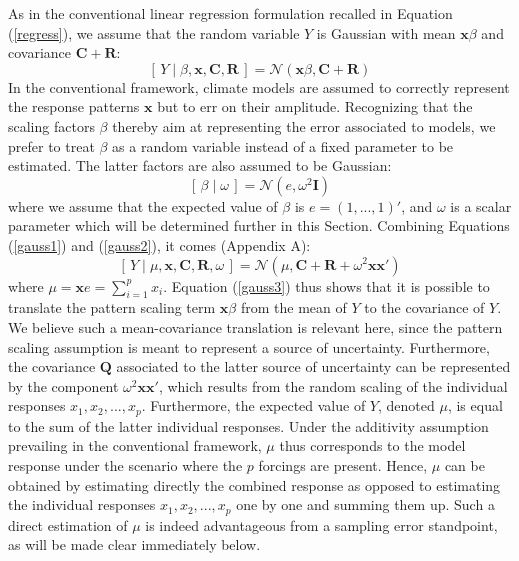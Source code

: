 \documentclass[12pt]{article}
\newcommand{\x}{\boldsymbol{x}}
\begin{document}
As in the conventional linear regression formulation recalled in Equation (\ref{regress}), %
we assume that the random variable $Y$ is Gaussian with mean $\x\beta$ and covariance $\mathbf{C}+\mathbf{R}$:%
\begin{equation} 
\label{gauss1}
\left[\,Y\mid \beta,\x,\mathbf{C}, \mathbf{R}\,\right] = \mathcal{N}(\x\beta,\mathbf{C}+\mathbf{R})
\end{equation}
In the conventional framework, climate models are assumed to correctly represent the response patterns $\x$ but to err on their amplitude. Recognizing that the scaling factors $\beta$ thereby aim at representing the error associated to models, we prefer to treat $\beta$ as a random variable instead of a fixed parameter to be estimated. The latter factors are also assumed to be Gaussian:
\begin{equation} 
\label{gauss2}
\left[\,\beta\mid\omega\,\right] =\mathcal{N}(e,\omega^2\mathbf I)
\end{equation}
where we assume that the expected value of $\beta$ is $e=(1,...,1)'$, and $\omega$ is a scalar parameter which will be determined further in this Section. Combining Equations (\ref{gauss1}) and (\ref{gauss2}), it comes (Appendix A):
\begin{equation} 
\label{gauss3}
\left[\,Y\mid\mu, \x,\mathbf{C}, \mathbf{R},\omega\,\right] =\mathcal{N}(\mu,\mathbf{C}+\mathbf{R}+\omega^2\x\x')
\end{equation}
where $\mu=\x e=\sum_{i=1}^p x_i$. Equation (\ref{gauss3}) thus shows that it is possible to translate the pattern scaling term $\x\beta$ from the mean of $Y$ to the covariance of $Y$. We believe such a mean-covariance translation is relevant here, since the pattern scaling assumption is meant to represent a source of uncertainty. Furthermore, the covariance $\mathbf Q$ associated to the latter source of uncertainty can be represented by the component $\omega^2\x\x'$, which results from the random scaling of the individual responses $x_1, x_2,...,x_p$. Furthermore, the expected value of $Y$, denoted $\mu$, is equal to the sum of the latter individual responses. Under the additivity assumption prevailing in the conventional framework, $\mu$ thus corresponds to the model response under the scenario where the $p$ forcings are present. Hence, $\mu$ can be obtained by estimating directly the combined response as opposed to estimating the individual responses $x_1, x_2,...,x_p$ one by one and summing them up. Such a direct estimation of $\mu$ is indeed advantageous from a sampling error standpoint, as will be made clear immediately below.
\end{document}
